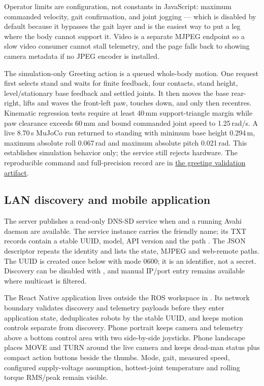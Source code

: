 \documentclass[11pt,a4paper]{article}
\begin{document}
Operator limits are configuration, not constants in JavaScript: maximum
commanded velocity, gait confirmation, and joint jogging --- which is disabled
by default because it bypasses the gait layer and is the easiest way to put a
leg where the body cannot support it. Video is a separate MJPEG endpoint so a
slow video consumer cannot stall telemetry, and the page falls back to showing
camera metadata if no JPEG encoder is installed.

The simulation-only Greeting action is a queued whole-body motion. One request
first selects stand and waits for finite feedback, four contacts, stand height,
level/stationary base feedback and settled joints. It then moves the base
rear-right, lifts and waves the front-left paw, touches down, and only then
recentres. Kinematic regression tests require at least 40\,mm support-triangle
margin while paw clearance exceeds 60\,mm and bound commanded joint speed to
1.25\,rad/s. A live 8.70\,s MuJoCo run returned to standing with minimum base
height 0.294\,m, maximum absolute roll 0.067\,rad and maximum absolute pitch
0.021\,rad. This establishes simulation behavior only; the service still
rejects hardware. The reproducible command and full-precision record are in
\href{greeting_validation.json}{the greeting validation artifact}.

\subsection{LAN discovery and mobile application}

The server publishes a read-only  DNS-SD service
when  and a running Avahi daemon are available. The
service instance carries the friendly name; its TXT records contain a stable UUID,
model, API version and the path
. The JSON descriptor repeats the identity and lists
the state, MJPEG and web-remote paths. The UUID is created once below
 with mode 0600; it is an identifier,
not a secret. Discovery can be disabled with , and
manual IP/port entry remains available where multicast is filtered.

The React Native application lives outside the ROS workspace in
. Its network boundary validates discovery and
telemetry payloads before they enter application state, deduplicates robots by
the stable UUID, and keeps motion controls separate from discovery. Phone
portrait keeps camera and telemetry above a bottom control area with two
side-by-side joysticks. Phone landscape places MOVE and TURN around the live
camera and keeps dead-man status plus compact action buttons beside the thumbs. Mode, gait, measured
speed, configured supply-voltage assumption, hottest-joint temperature and
rolling torque RMS/peak remain visible.
\end{document}
